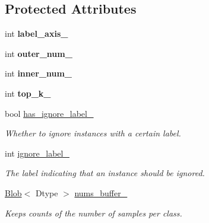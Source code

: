 \subsection*{Protected Attributes}
\begin{DoxyCompactItemize}
\item 
int {\bfseries label\+\_\+axis\+\_\+}\hypertarget{classcaffe_1_1AccuracyLayer_aafbbed754511b427a65d9f95707e9455}{}\label{classcaffe_1_1AccuracyLayer_aafbbed754511b427a65d9f95707e9455}

\item 
int {\bfseries outer\+\_\+num\+\_\+}\hypertarget{classcaffe_1_1AccuracyLayer_a374b3c8ce90238ec1769abf1b3b3f748}{}\label{classcaffe_1_1AccuracyLayer_a374b3c8ce90238ec1769abf1b3b3f748}

\item 
int {\bfseries inner\+\_\+num\+\_\+}\hypertarget{classcaffe_1_1AccuracyLayer_aede524eb7411cc81e3d5e62a34e96a4d}{}\label{classcaffe_1_1AccuracyLayer_aede524eb7411cc81e3d5e62a34e96a4d}

\item 
int {\bfseries top\+\_\+k\+\_\+}\hypertarget{classcaffe_1_1AccuracyLayer_a1048e10c5a499ace931cbafb9cd790d9}{}\label{classcaffe_1_1AccuracyLayer_a1048e10c5a499ace931cbafb9cd790d9}

\item 
bool \hyperlink{classcaffe_1_1AccuracyLayer_a4acdfaf6db79fbe1983b8439391ad15e}{has\+\_\+ignore\+\_\+label\+\_\+}\hypertarget{classcaffe_1_1AccuracyLayer_a4acdfaf6db79fbe1983b8439391ad15e}{}\label{classcaffe_1_1AccuracyLayer_a4acdfaf6db79fbe1983b8439391ad15e}

\begin{DoxyCompactList}\small\item\em Whether to ignore instances with a certain label. \end{DoxyCompactList}\item 
int \hyperlink{classcaffe_1_1AccuracyLayer_a2b8c2d647f43ffd6aa14e81f1c5b2bde}{ignore\+\_\+label\+\_\+}\hypertarget{classcaffe_1_1AccuracyLayer_a2b8c2d647f43ffd6aa14e81f1c5b2bde}{}\label{classcaffe_1_1AccuracyLayer_a2b8c2d647f43ffd6aa14e81f1c5b2bde}

\begin{DoxyCompactList}\small\item\em The label indicating that an instance should be ignored. \end{DoxyCompactList}\item 
\hyperlink{classcaffe_1_1Blob}{Blob}$<$ Dtype $>$ \hyperlink{classcaffe_1_1AccuracyLayer_a9acf4fa826e787fe64a55bcd2c62e66c}{nums\+\_\+buffer\+\_\+}\hypertarget{classcaffe_1_1AccuracyLayer_a9acf4fa826e787fe64a55bcd2c62e66c}{}\label{classcaffe_1_1AccuracyLayer_a9acf4fa826e787fe64a55bcd2c62e66c}

\begin{DoxyCompactList}\small\item\em Keeps counts of the number of samples per class. \end{DoxyCompactList}\end{DoxyCompactItemize}


